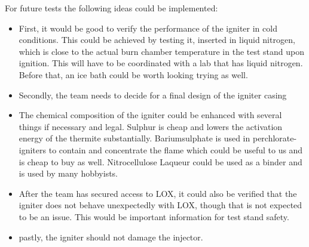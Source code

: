         For future tests the following ideas could be implemented: 
        \begin{itemize}
            \item First, it would be good to verify the performance of the igniter in cold conditions. This could be achieved by testing it, inserted in liquid nitrogen, which is close to the actual burn chamber temperature in the test stand upon ignition. This will have to be coordinated with a lab that has liquid nitrogen. Before that, an ice bath could be worth looking trying as well. 
            \item Secondly, the team needs to decide for a final design of the igniter casing
            \item The chemical composition of the igniter could be enhanced with several things if necessary and legal. Sulphur is cheap and lowers the activation energy of the thermite substantially. Bariumsulphate is used in perchlorate-igniters to contain and concentrate the flame which could be useful to us and is cheap to buy as well. Nitrocellulose Laqueur could be used as a binder and is used by many hobbyists. 
            \item After the team has secured access to LOX, it could also be verified that the igniter does not behave unexpectedly with LOX, though that is not expected to be an issue. This would be important information for test stand safety.
            \item pastly, the igniter should not damage the injector.



        \end{itemize}

        
    
        